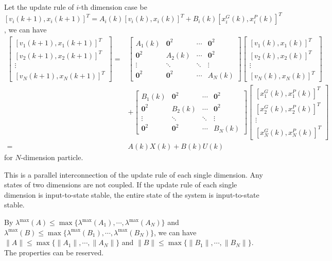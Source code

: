 Let the update rule of $ i $-th dimension case be 
$ [ v_{i}(k+1),  x_{i}(k+1) ]^{T} = A_{i}(k) [ v_{i}(k),  x_{i}(k) ]^{T} + B_{i}(k) [ x^{G}_{i} (k), x^{P}_{i} (k) ]^{T} $, 
we can have
\begin{equation}
\begin{aligned}
\begin{bmatrix}
[ v_{1}(k+1),  x_{1}(k+1) ]^{T} \\
[ v_{2}(k+1),  x_{2}(k+1) ]^{T} \\
\vdots \\
[ v_{N}(k+1),  x_{N}(k+1) ]^{T}
\end{bmatrix}
 = &
\begin{bmatrix}
A_{1}(k) & \mathbf{0}^{2} & \cdots & \mathbf{0}^{2} \\
\mathbf{0}^{2} & A_{2}(k) & \cdots & \mathbf{0}^{2} \\
\vdots & \ddots & \ddots & \vdots \\
\mathbf{0}^{2} & \mathbf{0}^{2} & \cdots & A_{N}(k)
\end{bmatrix}
\begin{bmatrix}
[ v_{1}(k),  x_{1}(k) ]^{T} \\
[ v_{2}(k),  x_{2}(k) ]^{T} \\
\vdots \\
[ v_{N}(k),  x_{N}(k) ]^{T}
\end{bmatrix} \\
& + \begin{bmatrix}
B_{1}(k) & \mathbf{0}^{2} & \cdots & \mathbf{0}^{2} \\
\mathbf{0}^{2} & B_{2}(k) & \cdots & \mathbf{0}^{2} \\
\vdots & \ddots & \ddots & \vdots \\
\mathbf{0}^{2} & \mathbf{0}^{2} & \cdots & B_{N}(k)
\end{bmatrix}
\begin{bmatrix}
[ x^{G}_{1} (k), x^{P}_{1} (k) ]^{T} \\
[ x^{G}_{2} (k), x^{P}_{2} (k) ]^{T} \\
\vdots \\
[ x^{G}_{N} (k), x^{P}_{N} (k) ]^{T}
\end{bmatrix} \\
= & A(k) X(k) + B(k) U(k)
\end{aligned}
\end{equation}
for $ N $-dimension particle.

This is a parallel interconnection of the update rule of each single dimension.
Any states of two dimensions are not coupled. 
If the update rule of each single dimension is input-to-state stable, the entire state of the system is input-to-state stable.

By
$ \lambda^{\max} (A) \leq \max \{ \lambda^{\max} (A_{1}), \cdots , \lambda^{\max} (A_{N}) \} $ and 
$ \lambda^{\max} (B) \leq \max \{ \lambda^{\max} (B_{1}), \cdots , \lambda^{\max} (B_{N}) \} $,
we can have
$ \lVert A \rVert \leq \max \{ \lVert A_{1} \rVert, \cdots , \lVert A_{N} \rVert \}  $
and
$ \lVert B \rVert \leq \max \{ \lVert B_{1} \rVert, \cdots , \lVert B_{N} \rVert \}  $.
The properties can be reserved.
